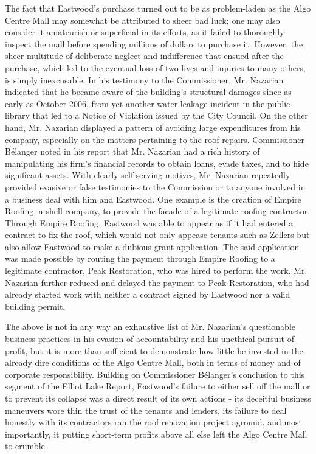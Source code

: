 \documentclass[12pt]{article}
\begin{document}
The fact that Eastwood's purchase turned out to be as problem-laden as the Algo Centre Mall may somewhat be attributed to sheer bad luck; one may also consider it amateurish or superficial in its efforts, as it failed to thoroughly inspect the mall before spending millions of dollars to purchase it. However, the sheer multitude of deliberate neglect and indifference that ensued after the purchase, which led to the eventual loss of two lives and injuries to many others, is simply inexcusable. In his testimony to the Commissioner, Mr. Nazarian indicated that he became aware of the building's structural damages since as early as October 2006, from yet another water leakage incident in the public library that led to a Notice of Violation issued by the City Council. On the other hand, Mr. Nazarian displayed a pattern of avoiding large expenditures from his company, especially on the matters pertaining to the roof repairs. Commissioner Bélanger noted in his report that Mr. Nazarian had a rich history of manipulating his firm's financial records to obtain loans, evade taxes, and to hide significant assets. With clearly self-serving motives, Mr. Nazarian repeatedly provided evasive or false testimonies to the Commission or to anyone involved in a business deal with him and Eastwood. One example is the creation of Empire Roofing, a shell company, to provide the facade of a legitimate roofing contractor. Through Empire Roofing, Eastwood was able to appear as if it had entered a contract to fix the roof, which would not only appease tenants such as Zellers but also allow Eastwood to make a dubious grant application. The said application was made possible by routing the payment through Empire Roofing to a legitimate contractor, Peak Restoration, who was hired to perform the work. Mr. Nazarian further reduced and delayed the payment to Peak Restoration, who had already started work with neither a contract signed by Eastwood nor a valid building permit. 

The above is not in any way an exhaustive list of Mr. Nazarian's questionable business practices in his evasion of accountability and his unethical pursuit of profit, but it is more than sufficient to demonstrate how little he invested in the already dire conditions of the Algo Centre Mall, both in terms of money and of corporate responsibility. Building on Commissioner Bélanger's conclusion to this segment of the Elliot Lake Report, Eastwood's failure to either sell off the mall or to prevent its collapse was a direct result of its own actions - its deceitful business maneuvers wore thin the trust of the tenants and lenders, its failure to deal honestly with its contractors ran the roof renovation project aground, and most importantly, it putting short-term profits above all else left the Algo Centre Mall to crumble.
\end{document}
